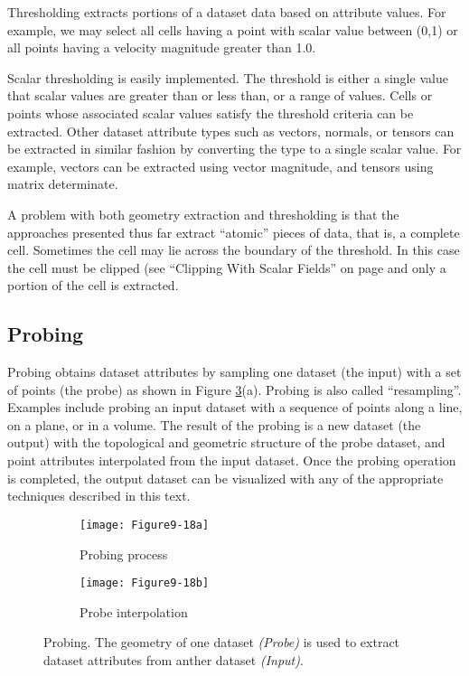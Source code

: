 Thresholding extracts portions of a dataset data based on attribute values. For example, we may select all cells having a point with scalar value between (0,1) or all points having a velocity magnitude greater than 1.0.

Scalar thresholding is easily implemented. The threshold is either a single value that scalar values are greater than or less than, or a range of values. Cells or points whose associated scalar values satisfy the threshold criteria can be extracted. Other dataset attribute types such as vectors, normals, or tensors can be extracted in similar fashion by converting the type to a single scalar value. For example, vectors can be extracted using vector magnitude, and tensors using matrix determinate.

A problem with both geometry extraction and thresholding is that the approaches presented thus far extract ``atomic'' pieces of data, that is, a complete cell. Sometimes the cell may lie across the boundary of the threshold. In this case the cell must be clipped (see ``Clipping With Scalar Fields'' on page \pageref{subsec:clipping_with_scalar_fields} and only a portion of the cell is extracted.

\subsection{Probing}
\label{subsec:probing}

Probing obtains dataset attributes by sampling one dataset (the input) with a set of points (the probe) as shown in Figure \ref{fig:Figure9-18}(a). Probing is also called ``resampling''. Examples include probing an input dataset with a sequence of points along a line, on a plane, or in a volume. The result of the probing is a new dataset (the output) with the topological and geometric structure of the probe dataset, and point attributes interpolated from the input dataset. Once the probing operation is completed, the output dataset can be visualized with any of the appropriate techniques described in this text.

\begin{figure}[htb]
	\begin{subfigure}[h]{0.48\linewidth}
		\texttt{[image: Figure9-18a]}
		\captionsetup{justification=centering}
		\caption{Probing process}
		\label{fig:Figure9-18a}
	\end{subfigure}
	\hfill
	\begin{subfigure}[h]{0.48\linewidth}
		\texttt{[image: Figure9-18b]}
		\captionsetup{justification=centering}
		\caption{Probe interpolation}
		\label{fig:Figure9-18b}
	\end{subfigure}
	\caption{Probing. The geometry of one dataset \textit{(Probe)} is used to extract dataset attributes from anther dataset \textit{(Input)}.}\label{fig:Figure9-18}
\end{figure}

